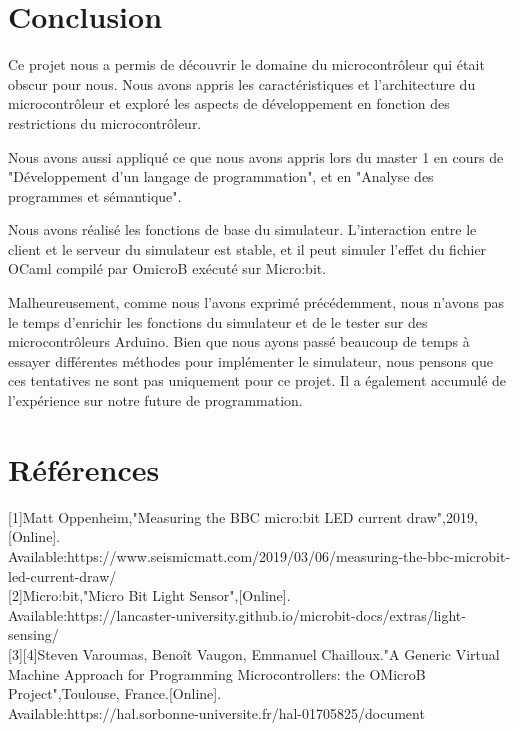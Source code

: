 \documentclass[14px]{article}
\begin{document}
	\section{Conclusion}
	Ce projet nous a permis de découvrir le domaine du microcontrôleur qui était obscur pour nous. Nous avons appris les caractéristiques et l'architecture du microcontrôleur et exploré les aspects de développement en fonction des restrictions du microcontrôleur.

	Nous avons aussi appliqué ce que nous avons appris lors du master 1 en cours de "Développement d'un langage de programmation", et en "Analyse des programmes et sémantique".

	Nous avons réalisé les fonctions de base du simulateur. L’interaction entre le client et le serveur du simulateur est stable, et il peut simuler l'effet du fichier OCaml compilé par OmicroB exécuté sur Micro:bit.

	Malheureusement, comme nous l'avons exprimé précédemment, nous n'avons pas le temps d'enrichir les fonctions du simulateur et de le tester sur des microcontrôleurs Arduino. Bien que nous ayons passé beaucoup de temps à essayer différentes méthodes pour implémenter le simulateur, nous pensons que ces tentatives ne sont pas uniquement pour ce projet. Il a également accumulé de l'expérience sur notre future de programmation.

	\section{Références}
	[1]Matt Oppenheim,"Measuring the BBC micro:bit LED current draw",2019,[Online].\\
	Available:https://www.seismicmatt.com/2019/03/06/measuring-the-bbc-microbit-led-current-draw/\\

	[2]Micro:bit,"Micro Bit Light Sensor",[Online].\\
	Available:https://lancaster-university.github.io/microbit-docs/extras/light-sensing/\\

	[3][4]Steven Varoumas, Benoît Vaugon, Emmanuel Chailloux."A Generic Virtual Machine Approach for Programming Microcontrollers: the OMicroB Project",Toulouse, France.[Online].\\
	Available:https://hal.sorbonne-universite.fr/hal-01705825/document\\
\end{document}
